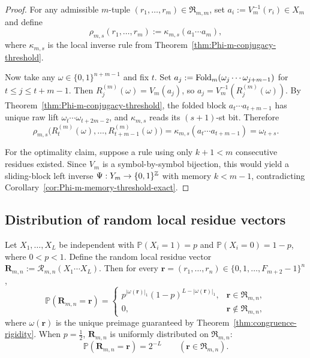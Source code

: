 \begin{proof}
For any admissible $m$-tuple $(r_1,\ldots,r_m)\in\mathfrak R_{m,m}$, set
$a_i:=V_m^{-1}(r_i)\in X_m$ and define
\[
\rho_{m,s}(r_1,\ldots,r_m):=\kappa_{m,s}(a_1\cdots a_m),
\]
where $\kappa_{m,s}$ is the local inverse rule from
Theorem~\ref{thm:Phi-m-conjugacy-threshold}.

Now take any $\omega\in\{0,1\}^{n+m-1}$ and fix $t$.  Set
$a_j:=\operatorname{Fold}_m(\omega_j\cdots\omega_{j+m-1})$ for $t\le j\le t+m-1$.  Then
$R_j^{(m)}(\omega)=V_m(a_j)$, so $a_j=V_m^{-1}(R_j^{(m)}(\omega))$.  By
Theorem~\ref{thm:Phi-m-conjugacy-threshold}, the folded block
$a_t\cdots a_{t+m-1}$ has unique raw lift
$\omega_t\cdots\omega_{t+2m-2}$, and $\kappa_{m,s}$ reads its $(s+1)$-st
bit.  Therefore
\[
\rho_{m,s}\bigl(R_t^{(m)}(\omega),\ldots,R_{t+m-1}^{(m)}(\omega)\bigr)
=
\kappa_{m,s}(a_t\cdots a_{t+m-1})
=
\omega_{t+s}.
\]

For the optimality claim, suppose a rule using only $k+1<m$ consecutive
residues existed.  Since $V_m$ is a symbol-by-symbol bijection, this would
yield a sliding-block left inverse $\Psi:Y_m\to\{0,1\}^{\mathbb{Z}}$ with memory
$k<m-1$, contradicting
Corollary~\ref{cor:Phi-m-memory-threshold-exact}.
\end{proof}

\subsection{Distribution of random local residue vectors}

\begin{theorem}
\label{thm:random-residue-distribution}
Let $X_1,\ldots,X_L$ be independent with
$\mathbb P(X_i=1)=p$ and $\mathbb P(X_i=0)=1-p$,
where $0<p<1$.  Define the random local residue vector
$\mathbf R_{m,n}:=\mathcal R_{m,n}(X_1\cdots X_L)$.  Then for every
$\mathbf r=(r_1,\ldots,r_n)\in\{0,1,\ldots,F_{m+2}-1\}^n$,
\[
\mathbb P(\mathbf R_{m,n}=\mathbf r)=
\begin{cases}
p^{|\omega(\mathbf r)|_1}(1-p)^{L-|\omega(\mathbf r)|_1},
& \mathbf r\in\mathfrak R_{m,n},\\[4pt]
0,& \mathbf r\notin\mathfrak R_{m,n},
\end{cases}
\]
where $\omega(\mathbf r)$ is the unique preimage guaranteed by
Theorem~\textup{\ref{thm:congruence-rigidity}}.  When $p=\tfrac12$,
$\mathbf R_{m,n}$ is uniformly distributed on $\mathfrak R_{m,n}$:
\[
\mathbb P(\mathbf R_{m,n}=\mathbf r)=2^{-L}
\qquad (\mathbf r\in\mathfrak R_{m,n}).
\]
\end{theorem}

